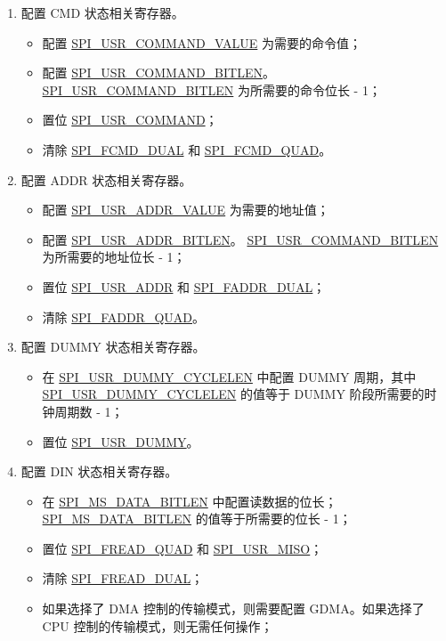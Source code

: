 \documentclass[main\_\_CN.tex]{subfiles}
\begin{document}
\begin{enumerate}
    \item 配置 CMD 状态相关寄存器。
        \begin{itemize}
            \item 配置 \hyperref[fielddesc:SPIUSRCOMMANDVALUE]{SPI\_USR\_COMMAND\_VALUE} 为需要的命令值；
            \item 配置 \hyperref[fielddesc:SPIUSRCOMMANDBITLEN]{SPI\_USR\_COMMAND\_BITLEN}。 \hyperref[fielddesc:SPIUSRCOMMANDBITLEN]{SPI\_USR\_COMMAND\_BITLEN} 为所需要的命令位长 - 1；
            \item 置位 \hyperref[fielddesc:SPIUSRCOMMAND]{SPI\_USR\_COMMAND}；
            \item 清除 \hyperref[fielddesc:SPIFCMDDUAL]{SPI\_FCMD\_DUAL} 和 \hyperref[fielddesc:SPIFCMDQUAD]{SPI\_FCMD\_QUAD}。
        \end{itemize}

    \item 配置 ADDR 状态相关寄存器。
        \begin{itemize}
            \item 配置 \hyperref[fielddesc:SPIUSRADDRVALUE]{SPI\_USR\_ADDR\_VALUE} 为需要的地址值；
            \item 配置 \hyperref[fielddesc:SPIUSRADDRBITLEN]{SPI\_USR\_ADDR\_BITLEN}。 \hyperref[fielddesc:SPIUSRADDRBITLEN]{SPI\_USR\_COMMAND\_BITLEN} 为所需要的地址位长 - 1；
            \item 置位 \hyperref[fielddesc:SPIUSRADDR]{SPI\_USR\_ADDR} 和 \hyperref[fielddesc:SPIFADDRDUAL]{SPI\_FADDR\_DUAL}；
            \item 清除 \hyperref[fielddesc:SPIFADDRQUAD]{SPI\_FADDR\_QUAD}。
        \end{itemize}

    \item 配置 DUMMY 状态相关寄存器。
        \begin{itemize}
            \item 在 \hyperref[fielddesc:SPIUSRDUMMYCYCLELEN]{SPI\_USR\_DUMMY\_CYCLELEN} 中配置 DUMMY 周期，其中 \hyperref[fielddesc:SPIUSRDUMMYCYCLELEN]{SPI\_USR\_DUMMY\_CYCLELEN} 的值等于 DUMMY 阶段所需要的时钟周期数 - 1；
            \item 置位 \hyperref[fielddesc:SPIUSRDUMMY]{SPI\_USR\_DUMMY}。
        \end{itemize}

    \item 配置 DIN 状态相关寄存器。
        \begin{itemize}
            \item 在 \hyperref[fielddesc:SPIMSDATABITLEN]{SPI\_MS\_DATA\_BITLEN} 中配置读数据的位长； \hyperref[fielddesc:SPIMSDATABITLEN]{SPI\_MS\_DATA\_BITLEN} 的值等于所需要的位长 - 1；
            \item 置位 \hyperref[fielddesc:SPIFREADQUAD]{SPI\_FREAD\_QUAD} 和 \hyperref[fielddesc:SPIUSRMISO]{SPI\_USR\_MISO}；
            \item 清除 \hyperref[fielddesc:SPIFREADDUAL]{SPI\_FREAD\_DUAL}；
            \item 如果选择了 DMA 控制的传输模式，则需要配置 GDMA。如果选择了 CPU 控制的传输模式，则无需任何操作；
        \end{itemize}


\end{enumerate}
\end{document}
